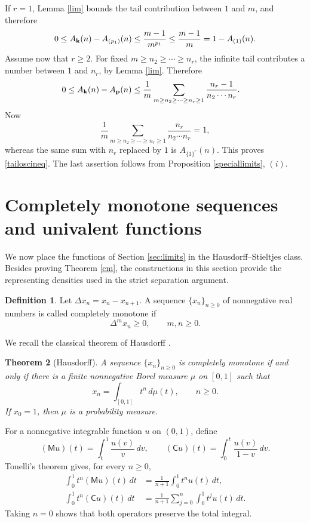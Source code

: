 \documentclass[12pt,a4paper]{amsart}
\makeatletter
\numberwithin{equation}{section}
\renewenvironment{proof}[1][Proof]{%
  \par\pushQED{\qed}%
  \normalfont\topsep6\p@\@plus6\p@\relax
  \trivlist
  \item[\hskip\labelsep\bfseries #1:]\ignorespaces
}{%
  \popQED\endtrivlist\@endpefalse
}
\theoremstyle{plain}
\newtheorem{Thm}{Theorem}[section]
\theoremstyle{definition}
\newtheorem{Def}[Thm]{Definition}
\makeatother
\begin{document}
\begin{proof}
If $r=1$, Lemma \ref{lim} bounds the tail contribution between $1$ and $m$, and therefore
\[
0\leq A_{\bf k}(n)-A_{(p_1)}(n)
\leq\frac{m-1}{m^{p_1}}
\leq\frac{m-1}{m}=1-A_{(1)}(n).
\]
Assume now that $r\geq2$.  For fixed $m\geq n_2\geq\cdots\geq n_r$, the infinite tail contributes a number between $1$ and $n_r$, by Lemma \ref{lim}.  Therefore
\[
\begin{split}
0\leq A_{\bf k}(n)-A_{\bf p}(n)
&\leq\frac1m
\sum_{m\geq n_2\geq\cdots\geq n_r\geq 1}
\frac{n_r-1}{n_2\cdots n_r}.
\end{split}
\]
Now
\[
\frac1m
\sum_{m\geq n_2\geq\cdots\geq n_r\geq 1}
\frac{n_r}{n_2\cdots n_r}=1,
\]
whereas the same sum with $n_r$ replaced by $1$ is $A_{\{1\}^{r}}(n)$.  This proves \eqref{tailoscineq}.  The last assertion follows from Proposition \ref{speciallimits}, $(i)$.
\end{proof}

\section{Completely monotone sequences and univalent functions}\label{sec:cm}
We now place the functions of Section \ref{sec:limits} in the Hausdorff--Stieltjes class.  Besides proving Theorem \ref{cm}, the constructions in this section provide the representing densities used in the strict separation argument.

\begin{Def}
Let $\Delta x_n=x_n-x_{n+1}$.  A sequence $\{x_n\}_{n\geq 0}$ of nonnegative real numbers is called completely monotone if
\[
\Delta^m x_n\geq 0,
\qquad m,n\geq 0.
\]
\end{Def}

We recall the classical theorem of Hausdorff \cite{hau,wid}.

\begin{Thm}[Hausdorff]\label{hausdorff}
A sequence $\{x_n\}_{n\geq 0}$ is completely monotone if and only if there is a finite nonnegative Borel measure $\mu$ on $[0,1]$ such that
\[
x_n=\int_{[0,1]}t^n\,d\mu(t),
\qquad n\geq 0.
\]
If $x_0=1$, then $\mu$ is a probability measure.
\end{Thm}

For a nonnegative integrable function $u$ on $(0,1)$, define
\begin{equation}\label{MCdef}
(\mathsf{M}u)(t)=\int_t^1\frac{u(v)}{v}\,dv,
\qquad
(\mathsf{C}u)(t)=\int_0^t\frac{u(v)}{1-v}\,dv.
\end{equation}
Tonelli's theorem gives, for every $n\geq 0$,
\begin{align}
\int_0^1t^n(\mathsf{M}u)(t)\,dt
&=\frac1{n+1}\int_0^1t^nu(t)\,dt,\label{Mmoment}\\
\int_0^1t^n(\mathsf{C}u)(t)\,dt
&=\frac1{n+1}\sum_{j=0}^{n}\int_0^1t^ju(t)\,dt.\label{Cmoment}
\end{align}
Taking $n=0$ shows that both operators preserve the total integral.
\end{document}
